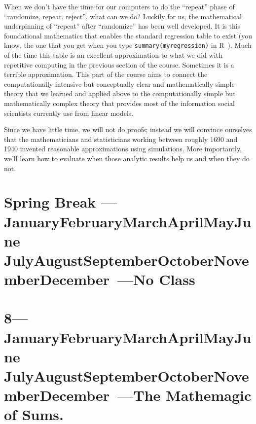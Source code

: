 \documentclass[10pt]{article}
\def\themonth{\ifcase\month\or
  January\or February\or March\or April\or May\or June\or
  July\or August\or September\or October\or November\or December\fi}
\begin{document}
When we don't have the time for our computers to do the ``repeat''
phase of ``randomize, repeat, reject'', what can we do? Luckily for
us, the mathematical underpinning of ``repeat'' after ``randomize''
has been well developed. It is this foundational mathematics that
enables the standard regression table to exist (you know, the one that
you get when you type \texttt{summary(myregression)} in
R~). Much of the time this table is an excellent approximation
to what we did with repetitive computing in the previous section of
the course. Sometimes it is a terrible approximation. This part of the
course aims to connect the computationally intensive but conceptually
clear and mathematically simple theory that we learned and applied
above to the computationally simple but mathematically complex theory
that provides most of the information social scientists currently use
from linear models.

Since we have little time, we will not do proofs; instead we will
convince ourselves that the mathematicians and statisticians working
between roughly 1690 and 1940 invented reasonable approximations using
simulations. More importantly, we'll learn how to
evaluate when those analytic results help us and when they do
not.




\AdvanceDate[7]
\section{Spring Break --- \themonth~\the\day---No Class}



\AdvanceDate[7]
\section{8---\themonth~\the\day---The Mathemagic of Sums.}
\end{document}
